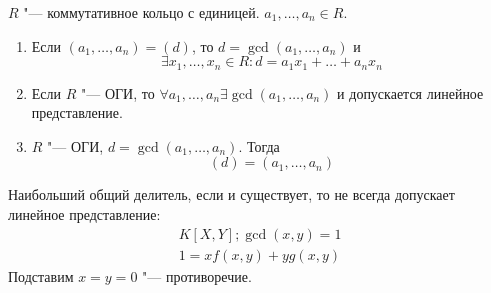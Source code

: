 \begin{theorem}{}
	$R$ "--- коммутативное кольцо с единицей. $a_{1}, \dots, a_{n} \in R$.
	\begin{enumerate}
	\item
		Если $\left(a_{1}, \dots, a_{n}\right) = \left(d\right)$, то $d = \gcd \left(a_{1}, \dots, a_{n}\right)$ и
		\[ \exists x_{1}, \dots, x_{n} \in R \colon d = a_{1}x_{1} + \dots + a_{n}x_{n} \]

	\item
		Если $R$ "--- ОГИ, то $\forall a_{1}, \dots, a_{n} \exists \gcd \left(a_{1}, \dots, a_{n}\right)$ и
		допускается линейное представление.

	\item
		$R$ "--- ОГИ, $d = \gcd \left(a_{1}, \dots, a_{n}\right)$. Тогда
		\[ \left(d\right) = \left(a_{1}, \dots, a_{n}\right) \]
	\end{enumerate}
\end{theorem}

\begin{Rem}
	Наибольший общий делитель, если и существует, то не всегда допускает линейное представление:
	\begin{gather*}
		K\left[X, Y\right]; \gcd \left(x, y\right) = 1\\
		1 = xf\left(x, y\right) + yg\left(x, y\right)
	\end{gather*}
	Подставим $x = y = 0$ "--- противоречие.
\end{Rem}

